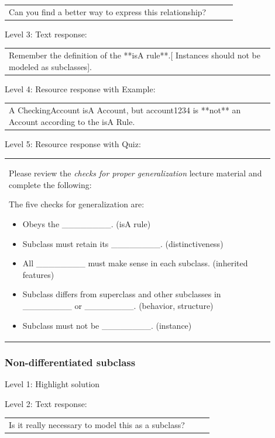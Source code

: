 \begin{tabular}{|p{0.9\linewidth}}
Can you find a better way to express this relationship?
\end{tabular} \medskip

\noindent Level 3: Text response: \medskip

\begin{tabular}{|p{0.9\linewidth}}
Remember the definition of the **isA rule**.[ Instances should not be modeled as subclasses].
\end{tabular} \medskip

\noindent Level 4: Resource response with Example: \medskip

\begin{tabular}{|p{0.9\linewidth}}
A CheckingAccount isA Account, but account1234 is **not** an Account according to the isA Rule.
\end{tabular} \medskip

\noindent Level 5: Resource response with Quiz: \medskip

\begin{tabular}{|p{0.9\linewidth}}
Please review the \textit{checks for proper generalization} lecture material
and complete the following:

The five checks for generalization are:
\begin{itemize}
    \item Obeys the \_\_\_\_\_\_\_\_. (isA rule)
    \item Subclass must retain its \_\_\_\_\_\_\_\_. (distinctiveness)
    \item All \_\_\_\_\_\_\_\_ must make sense in each subclass. (inherited features)
    \item Subclass differs from superclass and other subclasses in \_\_\_\_\_\_\_\_ or \_\_\_\_\_\_\_\_. (behavior, structure)
    \item Subclass must not be \_\_\_\_\_\_\_\_. (instance)
\end{itemize}

\end{tabular} \medskip


\subsubsection{Non-differentiated subclass}

\noindent Level 1: Highlight solution \medskip

\noindent Level 2: Text response: \medskip

\begin{tabular}{|p{0.9\linewidth}}
Is it really necessary to model this as a subclass?
\end{tabular} \medskip

